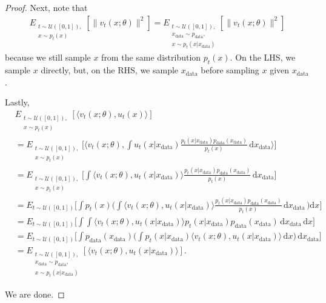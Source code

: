 \documentclass[10pt]{article}
\newcommand{\dee}{\mathrm{d}}
\newcommand{\mcal}[1]{\mathcal{#1}}
\newcommand{\data}{\mathrm{data}}
\begin{document}
\begin{itemize}
\begin{proof}
    Next, note that
    \begin{align*}
      E_{\substack{t \sim \mcal{U}([0,1]),\\ x \sim p_t(x)}}[\| v_t(x;\theta) \|^2] = E_{\substack{t \sim \mcal{U}([0,1]),\\ x_{\data} \sim p_{\data},\\ x \sim p_t(x|x_{\data})}}[\| v_t(x;\theta) \|^2]
    \end{align*}
    because we still sample $x$ from the same distribution $p_t(x)$. On the LHS, we sample $x$ directly, but, on the RHS, we sample $x_{\data}$ before sampling $x$ given $x_{\data}$.

    Lastly,
    \begin{align*}
      & E_{\substack{t \sim \mcal{U}([0,1]),\\ x \sim p_t(x)}}[\langle v_t(x;\theta), u_t(x) \rangle ] \\
      &= E_{\substack{t \sim \mcal{U}([0,1]),\\ x \sim p_t(x)}} \Bigg[\bigg\langle v_t(x;\theta), \int u_t(x|x_{\data}) \frac{p_t(x|x_{\data})p_{\data}(x_{\data})}{p_t(x)}\, \dee x_{\data} \bigg\rangle \Bigg] \\
      &= E_{\substack{t \sim \mcal{U}([0,1]),\\ x \sim p_t(x)}} \Bigg[ \int \langle v_t(x;\theta), u_t(x|x_{\data}) \rangle \frac{p_t(x|x_{\data})p_{\data}(x_{\data})}{p_t(x)}\, \dee x_{\data} \Bigg] \\
      &= E_{t \sim \mcal{U}([0,1])} \Bigg[ \int p_{t}(x) \bigg(\int \langle v_t(x;\theta), u_t(x|x_{\data}) \rangle \frac{p_t(x|x_{\data})p_{\data}(x_{\data})}{p_t(x)}\, \dee x_{\data}\,\bigg) \dee x \Bigg] \\
      &= E_{t \sim \mcal{U}([0,1])} \Bigg[ \int \int \langle v_t(x;\theta), u_t(x|x_{\data}) \rangle p_t(x|x_{\data})p_{\data}(x_{\data})\, \dee x_{\data}\, \dee x \Bigg] \\
      &= E_{t \sim \mcal{U}([0,1])} \Bigg[ \int p_{\data}(x_{\data}) \bigg( \int p_t(x|x_{\data}) \langle v_t(x;\theta), u_t(x|x_{\data}) \rangle \, \dee x\bigg) \, \dee x_{\data} \Bigg] \\
      &= E_{\substack{t \sim \mcal{U}([0,1]),\\ x_{\data} \sim p_{\data},\\ x \sim p_t(x|x_{\data})}} [\langle v_t(x;\theta), u_t(x|x_{\data}) \rangle].
    \end{align*}
    
    We are done.
  \end{proof}
\end{itemize}
\end{document}
